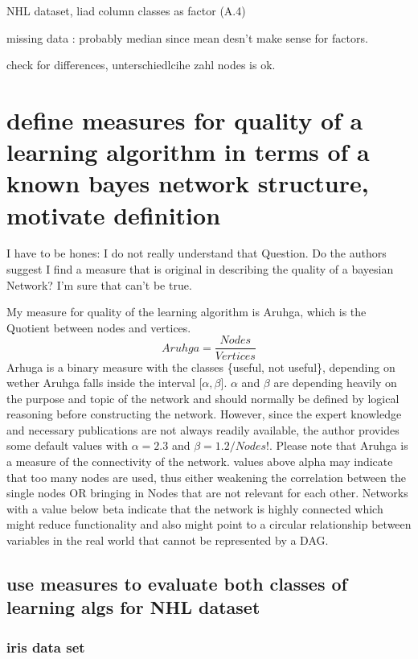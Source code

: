 \documentclass[]{article}
\begin{document}
NHL dataset, liad column classes as factor (A.4)

missing data : probably median since mean desn't make sense for factors.

check for differences, unterschiedlcihe zahl nodes is ok.

\section{define measures for quality of a learning algorithm in terms of
a known bayes network structure, motivate
definition}\label{define-measures-for-quality-of-a-learning-algorithm-in-terms-of-a-known-bayes-network-structure-motivate-definition}

I have to be hones: I do not really understand that Question. Do the
authors suggest I find a measure that is original in describing the
quality of a bayesian Network? I'm sure that can't be true.

My measure for quality of the learning algorithm is Aruhga, which is the
Quotient between nodes and vertices.
\[Aruhga = \frac{Nodes}{Vertices}\]Arhuga is a binary measure with the
classes \{useful, not useful\}, depending on wether Aruhga falls inside
the interval {[}$\alpha , \beta${]}. $\alpha$ and $\beta$ are depending
heavily on the purpose and topic of the network and should normally be
defined by logical reasoning before constructing the network. However,
since the expert knowledge and necessary publications are not always
readily available, the author provides some default values with
$\alpha = 2.3$ and $\beta = 1.2/Nodes!$. Please note that Aruhga is a
measure of the connectivity of the network. values above alpha may
indicate that too many nodes are used, thus either weakening the
correlation between the single nodes OR bringing in Nodes that are not
relevant for each other. Networks with a value below beta indicate that
the network is highly connected which might reduce functionality and
also might point to a circular relationship between variables in the
real world that cannot be represented by a DAG.

\subsection{use measures to evaluate both classes of learning algs for
NHL
dataset}\label{use-measures-to-evaluate-both-classes-of-learning-algs-for-nhl-dataset}

\subsubsection{iris data set}\label{iris-data-set}
\end{document}
